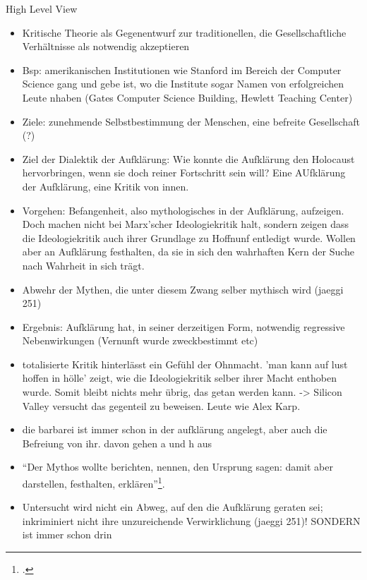\documentclass[a4paper, 12pt]{article}
\begin{document}
\begin{onehalfspace}
High Level View

\begin{itemize}
  \item Kritische Theorie als Gegenentwurf zur traditionellen, die Gesellschaftliche Verhältnisse als notwendig akzeptieren
  \item Bsp: amerikanischen Institutionen wie Stanford im Bereich der Computer Science gang und gebe ist, wo die Institute sogar Namen	 von erfolgreichen Leute nhaben (Gates Computer Science Building, Hewlett Teaching Center) 
  \item Ziele: zunehmende Selbstbestimmung der Menschen, eine befreite Gesellschaft (?)
  \item Ziel der Dialektik der Aufklärung: Wie konnte die Aufklärung den Holocaust hervorbringen, wenn sie doch reiner Fortschritt sein will? Eine AUfklärung der Aufklärung, eine Kritik von innen.
  \item Vorgehen: Befangenheit, also mythologisches in der Aufklärung, aufzeigen. Doch machen nicht bei Marx'scher Ideologiekritik halt, sondern zeigen dass die Ideologiekritik auch ihrer Grundlage zu Hoffnunf entledigt wurde. Wollen aber an Aufklärung festhalten, da sie in sich den wahrhaften Kern der Suche nach Wahrheit in sich trägt.
  \item Abwehr der Mythen, die unter diesem Zwang selber mythisch wird (jaeggi 251)
  \item Ergebnis: Aufklärung hat, in seiner derzeitigen Form, notwendig regressive 				Nebenwirkungen (Vernunft wurde zweckbestimmt etc)
  \item totalisierte Kritik hinterlässt ein Gefühl der Ohnmacht. 'man kann auf lust hoffen in hölle' zeigt, wie die Ideologiekritik selber ihrer Macht enthoben wurde. Somit bleibt nichts mehr übrig, das getan werden kann. -> Silicon Valley versucht das gegenteil zu beweisen. Leute wie Alex Karp.
  \item die barbarei ist immer schon in der aufklärung angelegt, aber auch die Befreiung von ihr. davon gehen a und h aus
  \item "`Der Mythos wollte berichten, nennen, den Ursprung sagen: damit aber darstellen, festhalten, erklären"'\footnote{\Cite[Siehe][S. 14]{dialektik-der-aufklaerung}.}.
  \item Untersucht wird nicht ein Abweg, auf den die Aufklärung geraten sei; inkriminiert nicht ihre unzureichende Verwirklichung (jaeggi 251)! SONDERN ist immer schon drin
\end{itemize}


\end{onehalfspace}
\end{document}
